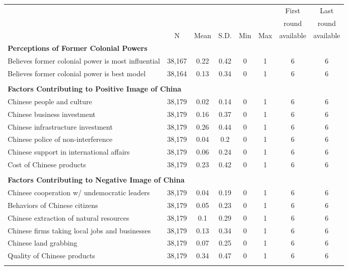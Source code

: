  \begin{tabular}{l ccccccc} 
 &   &      &      &     &     & First     & Last     \\ 
  &   &      &      &     &     & round     & round    \\ 
  & N & Mean & S.D. & Min & Max & available & available \\ 
 \hline  \multicolumn{8}{l}{\bf Perceptions of Former Colonial Powers} \\ 
 Believes former colonial power is most influential  &  38,167  &  0.22  &  0.42  &  0  &  1  &  6  &  6  \\ Believes former colonial power is best model  &  38,164  &  0.13  &  0.34  &  0  &  1  &  6  &  6  \\  & & & & & & & \\ 
  \multicolumn{8}{l}{\bf Factors Contributing to Positive Image of China} \\ 
 Chinese people and culture  &  38,179  &  0.02  &  0.14  &  0  &  1  &  6  &  6  \\ Chinese business investment  &  38,179  &  0.16  &  0.37  &  0  &  1  &  6  &  6  \\ Chinese infrastructure investment  &  38,179  &  0.26  &  0.44  &  0  &  1  &  6  &  6  \\ Chinese police of non-interference  &  38,179  &  0.04  &  0.2  &  0  &  1  &  6  &  6  \\ Chinese support in international affairs  &  38,179  &  0.06  &  0.24  &  0  &  1  &  6  &  6  \\ Cost of Chinese products  &  38,179  &  0.23  &  0.42  &  0  &  1  &  6  &  6  \\  & & & & & & & \\ 
  \multicolumn{8}{l}{\bf Factors Contributing to Negative Image of China} \\ 
 Chinese cooperation w/ undemocratic leaders  &  38,179  &  0.04  &  0.19  &  0  &  1  &  6  &  6  \\ Behaviors of Chinese citizens  &  38,179  &  0.05  &  0.23  &  0  &  1  &  6  &  6  \\ Chinese extraction of natural resources  &  38,179  &  0.1  &  0.29  &  0  &  1  &  6  &  6  \\ Chinese firms taking local jobs and businesses  &  38,179  &  0.13  &  0.34  &  0  &  1  &  6  &  6  \\ Chinese land grabbing  &  38,179  &  0.07  &  0.25  &  0  &  1  &  6  &  6  \\ Quality of Chinese products  &  38,179  &  0.34  &  0.47  &  0  &  1  &  6  &  6  \\  & & & & & & & \\ 

\end{tabular}
